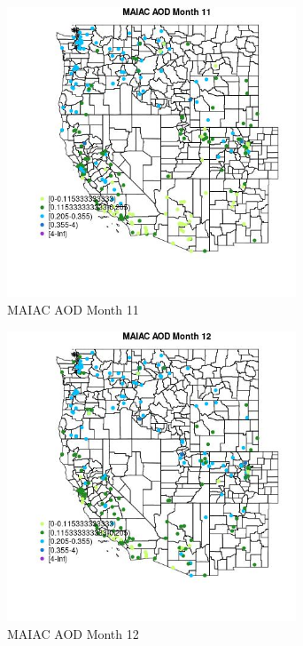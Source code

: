 \begin{figure} 
\centering  
\includegraphics[width=0.77\textwidth]{Code_Outputs/Report_ML_input_PM25_Step4_part_e_de_duplicated_aveswNAs_MapObsMo11MAIAC_AOD.jpg} 
\caption{\label{fig:Report_ML_input_PM25_Step4_part_e_de_duplicated_aveswNAsMapObsMo11MAIAC_AOD}MAIAC AOD Month 11} 
\end{figure} 
 

\begin{figure} 
\centering  
\includegraphics[width=0.77\textwidth]{Code_Outputs/Report_ML_input_PM25_Step4_part_e_de_duplicated_aveswNAs_MapObsMo12MAIAC_AOD.jpg} 
\caption{\label{fig:Report_ML_input_PM25_Step4_part_e_de_duplicated_aveswNAsMapObsMo12MAIAC_AOD}MAIAC AOD Month 12} 
\end{figure} 
 
